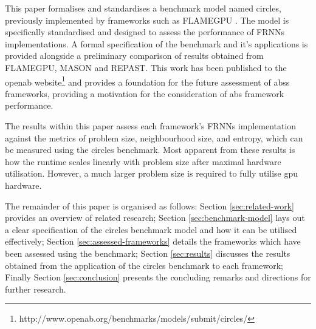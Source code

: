   This paper formalises and standardises a benchmark model named circles, previously implemented by frameworks such as FLAMEGPU \cite{RR082}. The model is specifically standardised and designed to assess the performance of FRNNs implementations. A formal specification of the benchmark and it's applications is provided alongside a preliminary comparison of results obtained from FLAMEGPU, MASON and REPAST. This work has been published to the \gls{openab} website\footnote{http://www.openab.org/benchmarks/models/submit/circles/} and provides a foundation for the future assessment of \glspl{abs} frameworks, providing a motivation for the consideration of \gls{abs} framework performance.
  
  The results within this paper assess each framework’s FRNNs implementation against the metrics of problem size, neighbourhood size, and entropy, which can be measured using the circles benchmark. Most apparent from these results is how the runtime scales linearly with problem size after maximal hardware utilisation. However, a much larger problem size is required to fully utilise \gls{gpu} hardware.
  
  The remainder of this paper is organised as follows: Section \ref{sec:related-work} provides an overview of related research; Section \ref{sec:benchmark-model} lays out a clear specification of the circles benchmark model and how it can be utilised effectively; Section \ref{sec:assessed-frameworks} details the frameworks which have been assessed using the benchmark; Section \ref{sec:results} discusses the results obtained from the application of the circles benchmark to each framework; Finally Section \ref{sec:conclusion} presents the concluding remarks and directions for further research.